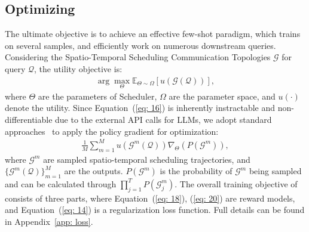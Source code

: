 \subsection{Optimizing \ourmethod}
The ultimate objective is to achieve an effective few-shot paradigm, which trains \ourmethod on several samples, and efficiently work on numerous downstream queries. Considering the Spatio-Temporal Scheduling Communication Topologies $\mathcal{G}$ for query $\mathcal{Q}$, the utility objective is:
\begin{gather}
    \arg \underset{\Theta}{\max} \mathbb{E}_{\Theta\sim \Omega}[u(\mathcal{G}(\mathcal{Q}))],\label{eq: 16}
\end{gather}
where $\Theta$ are the parameters of Scheduler, $\Omega$ are the parameter space, and $u(\cdot)$ denote the utility. Since Equation~(\ref{eq: 16}) is inherently instractable and non-differentiable due to the external API calls for LLMs, we adopt standard approaches~\citep{GDesigner,li2025assemble,zhang2025safesieve} to apply the policy gradient for optimization:
\begin{gather}
    \frac{1}{M} \sum_{m=1}^M u(\mathcal{G}^m(\mathcal{Q}))\nabla_\Theta({P(\mathcal{G}^m)}),\label{eq: 20}
\end{gather}
where $\mathcal{G}^m$ are sampled spatio-temporal scheduling trajectories, and $\{\mathcal{G}^m(\mathcal{Q})\}_{m=1}^M$ are the outputs. $P(\mathcal{G}^m)$ is the probability of $\mathcal{G}^m$ being sampled and can be calculated through $\prod_{j=1}^T P(\mathcal{G}^m_j)$. The overall training objective of \ourmethod consists of three parts, where Equation~(\ref{eq: 18}), (\ref{eq: 20}) are reward models, and Equation~(\ref{eq: 14}) is a regularization loss function. Full details can be found in Appendix~\ref{app: loss}.